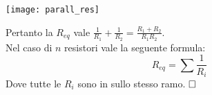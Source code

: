 \hfill%
\begin{minipage}{0.6\textwidth}\raggedleft
	\texttt{[image: parall\_res]}
\end{minipage}
Pertanto la $R_{eq}$ vale $\frac{1}{R_1} + \frac{1}{R_2} = \frac{R_1 + R_2}{R_1 R_2}$.\\
Nel caso di $n$ resistori vale la seguente formula:
\begin{equation}
    R_{eq} = \sum{\frac{1}{R_i}}
\end{equation}
Dove tutte le $R_i$ sono in  sullo stesso ramo.
$\hfill\square$